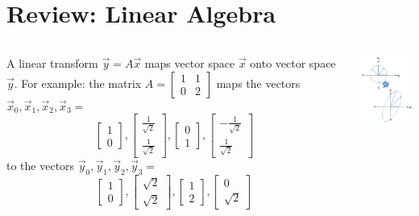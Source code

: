 \documentclass{beamer}
\begin{document}
\section[Linear Algebra]{Review: Linear Algebra}
\setcounter{subsection}{1}
\begin{frame}
  \begin{columns}[t]
    \column{2.75in}
    \begin{block}{}
      A linear transform $\vec{y}=A\vec{x}$ maps vector space $\vec{x}$
      onto vector space $\vec{y}$.  For example: the matrix
      $A=\left[\begin{array}{cc}1 & 1\\0&2\end{array}\right]$
      maps the vectors $\vec{x}_0,\vec{x}_1,\vec{x}_2,\vec{x}_3=$
      \[
      \left[\begin{array}{c}1\\0\end{array}\right],
      \left[\begin{array}{c}\frac{1}{\sqrt{2}}\\\frac{1}{\sqrt{2}}\end{array}\right],
      \left[\begin{array}{c}0\\1\end{array}\right],
      \left[\begin{array}{c}-\frac{1}{\sqrt{2}}\\\frac{1}{\sqrt{2}}\end{array}\right]
      \]
      to the vectors
      $\vec{y}_0,\vec{y}_1,\vec{y}_2,\vec{y}_3=$
      \[
      \left[\begin{array}{c}1\\0\end{array}\right],
      \left[\begin{array}{c}\sqrt{2}\\\sqrt{2}\end{array}\right],
      \left[\begin{array}{c}1\\2\end{array}\right],
      \left[\begin{array}{c}0\\\sqrt{2}\end{array}\right]
      \]
    \end{block}
    \column{1.5in}
    \begin{block}{}
      \includegraphics[width=1.45in]{linalg_review_fig1.png}
    \end{block}
  \end{columns}
\end{frame}
\end{document}
